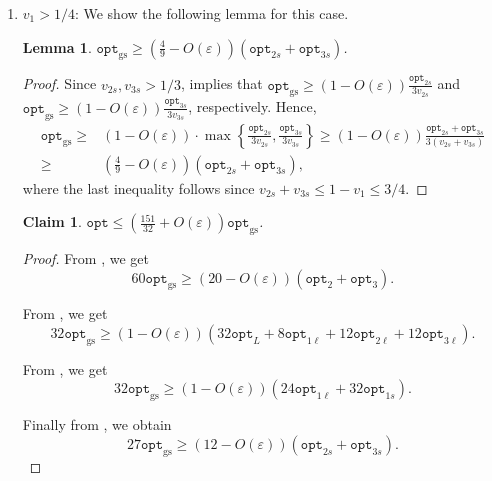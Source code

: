 \documentclass[10pt,a4paper]{amsart}
\renewcommand{\epsilon}{\varepsilon} %
\newtheorem{lemma}[theorem]{Lemma}
\newtheorem{claim}[theorem]{Claim}
\theoremstyle{definition}
\newcommand{\alg}{\mathtt{opt}_{\mathrm{gs}}}
\newcommand{\opt}{\mathtt{opt}}
\newcommand{\optgs}{\mathtt{opt}_{\mathrm{gs}}}
\newcommand{\optonel}{\mathtt{opt}_{1\ell}}
\newcommand{\optones}{\mathtt{opt}_{1s}}
\newcommand{\opttwol}{\mathtt{opt}_{2\ell}}
\newcommand{\opttwos}{\mathtt{opt}_{2s}}
\newcommand{\optthreel}{\mathtt{opt}_{3\ell}}
\newcommand{\optthrees}{\mathtt{opt}_{3s}}
\newcommand{\vtwos}{v_{2s}}
\newcommand{\vthrees}{v_{3s}}
\begin{document}
\begin{enumerate}
    \item $v_1 > 1/4$: We show the following lemma for this case.

    \begin{lemma}
    \label{lem:optgslb}
        $\displaystyle\optgs \ge \left(\frac{4}{9}-O(\epsilon)\right)(\opttwos+\optthrees)$.
    \end{lemma}
    \begin{proof}
        Since $\vtwos, \vthrees > 1/3$,  implies that $\alg \ge (1-O(\epsilon))\frac{\opttwos}{3\vtwos}$ and $\alg \ge (1-O(\epsilon))\frac{\optthrees}{3\vthrees}$, respectively. Hence,
        \begin{align*}
        \alg \ge& (1-O(\epsilon))\cdot \max\left\{\frac{\opttwos}{3\vtwos},\frac{\optthrees}{3\vthrees}\right\} \ge (1-O(\epsilon))\frac{\opttwos+\optthrees}{3(\vtwos+\vthrees)} \\ \ge& \left(\frac{4}{9}-O(\epsilon)\right)(\opttwos+\optthrees),
        \end{align*}
        where the last inequality follows since $\vtwos+\vthrees \le 1-v_1\le 3/4$.
    \end{proof}


    \begin{claim}
    \label{cla:151by32}
        $\displaystyle\opt \le \left(\frac{151}{32}+O(\epsilon)\right)\alg$.
    \end{claim}
    \begin{proof}
        From , we get
        \begin{equation}
        \label{eqn:4a}
            60\alg \ge (20-O(\epsilon))(\opt_2 + \opt_3).
        \end{equation}

        From , we get
        \begin{equation}
        \label{eqn:4b}
            32\alg \ge (1-O(\epsilon))(32\opt_L + 8\optonel + 12\opttwol + 12\optthreel).
        \end{equation}

        From , we get
        \begin{equation}
        \label{eqn:4c}
            32\alg \ge (1-O(\epsilon))(24\optonel + 32\optones).
        \end{equation}

        Finally from , we obtain
        \begin{equation}
        \label{eqn:4d}
            27\alg \ge (12-O(\epsilon))(\opttwos + \optthrees).
        \end{equation}


\end{proof}
\end{enumerate}
\end{document}
